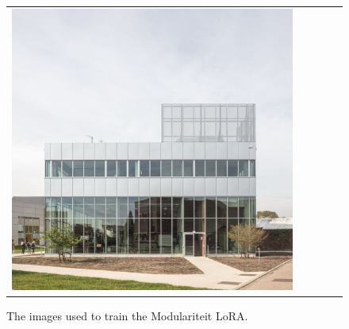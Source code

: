 \begin{figure}[H]
{\begin{tabular}{@{}ccccc@{}}
      \includegraphics[width=\linewidth]{Images/LoRAs/Modulariteit/Training_images/15.jpg} \\
    \end{tabular}%
  }
  \caption{The images used to train the Modulariteit LoRA.}
  \label{fig:gridmodulariteit}
\end{figure}
